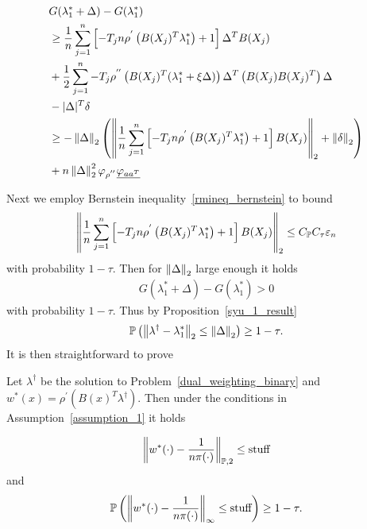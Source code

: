 \begin{align}
  \begin{split}
  & 
  G(\lambda^*_1 + \Delta) 
  -
  G(\lambda^*_1)
  \\
  &\ge
      \frac{1}{n}
      \sum_{j = 1}^{n} 
      \left[ 
        -T_j n 
        \rho^{'} 
        \left( 
          B(X_j)^T \lambda^*_1
        \right)
      +
      1
      \right]
      \Delta^T B(X_j)
      \\
  & +
      \frac{1}{2}
      \sum_{j = 1}^{n} 
        -T_j  
        \rho^{''} 
        \left( 
          B(X_j)^T (\lambda^*_1 + \xi \Delta)
        \right)
        \Delta^T
        \left( 
          B(X_j)
          B(X_j)^T
        \right)
        \Delta
        \\
  &-
      |\Delta|^T \delta
  \\
  &\ge
    - \left\lVert\Delta\right\rVert_2
    \left( 
    \left\lVert
      \frac{1}{n}
      \sum_{j = 1}^{n} 
      \left[ 
        -T_j n 
        \rho^{'} 
        \left( 
          B(X_j)^T \lambda^*_1
        \right)
      +
      1
      \right]
      B(X_j)
    \right\rVert_2
    +
    \left\lVert\delta\right\rVert_2
    \right)
    \\
  &+
  n
  \left\lVert\Delta\right\rVert^2_2
   \varphi_{\rho^{''}}
  \underline{\varphi_{aa^T}}
  \end{split}
\end{align}

Next we employ Bernstein inequality~\ref{rmineq_bernstein} to bound
\begin{align}
    \left\lVert
      \frac{1}{n}
      \sum_{j = 1}^{n} 
      \left[ 
        -T_j n 
        \rho^{'} 
        \left( 
          B(X_j)^T \lambda^*_1
        \right)
      +
      1
      \right]
      B(X_j)
    \right\rVert_2
    \le
    C_{\mathbb{P}} C_\tau \varepsilon_n
\end{align}
with probability $1 - \tau$.
Then for 
$\left\lVert\Delta\right\rVert_2$ large enough it holds
\begin{gather}
  G(\lambda^*_1 + \Delta) 
  -
  G(\lambda^*_1)
  >
  0
\end{gather}
with probability $1 - \tau$.
Thus by Proposition~\ref{syu_1_result}
  \begin{gather}
    \mathbb{P}
    \left( 
      \left\lVert
        \lambda^\dagger
        -
        \lambda^*_1
      \right\rVert_2
      \le
      \left\lVert\Delta\right\rVert_2
    \right)
    \ge 
    1 - \tau
    .
  \end{gather}
It is then straightforward to prove

\begin{theorem}
  Let 
  $\lambda^\dagger$
  be the solution to Problem~\ref{dual_weighting_binary}
  and 
  $w^*(x)=\rho^{'}\left( B(x)^T \lambda^\dagger \right)$.
  Then under the conditions in Assumption~\ref{assumption_1}
  it holds

  \begin{align}
  \left\lVert
    w^*(\cdot)
    -
    \frac{1}{n \pi(\cdot)}
  \right\rVert_{\mathbb{P}, 2}
  \le 
  \text{stuff}
  \end{align}
and 
  \begin{align}
    \mathbb{P}
    \left( 
  \left\lVert
    w^*(\cdot)
    -
    \frac{1}{n \pi(\cdot)}
  \right\rVert_\infty
  \le 
  \text{stuff}
   \right)
   \ge
  1 - \tau
  .
  \end{align}
\end{theorem}


